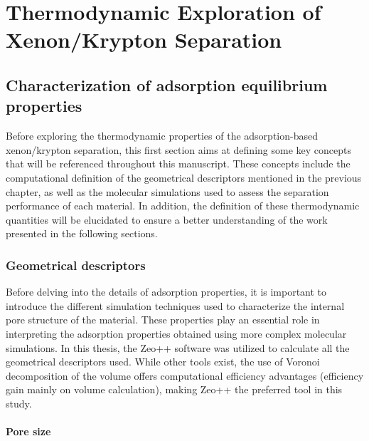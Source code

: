 \documentclass[main.tex]{subfiles}
\begin{document}
\chapter{Thermodynamic Exploration of Xenon/Krypton Separation}
\vspace*{-1\baselineskip}

\section{Characterization of adsorption equilibrium properties}

Before exploring the thermodynamic properties of the adsorption-based xenon/krypton separation, this first section aims at  defining some key concepts that will be referenced throughout this manuscript. These concepts include the computational definition of the geometrical descriptors mentioned in the previous chapter, as well as the molecular simulations used to assess the separation performance of each material. In addition, the definition of these thermodynamic quantities will be elucidated to ensure a better understanding of the work presented in the following sections.

\subsection{Geometrical descriptors}

Before delving into the details of adsorption properties, it is important to introduce the different simulation techniques used to characterize the internal pore structure of the material. These properties play an essential role in interpreting the adsorption properties obtained using more complex molecular simulations. In this thesis, the Zeo++ software was utilized to calculate all the geometrical descriptors used.\autocite{Zeo++} While other tools exist,\autocite{First_2013,PoreBlazer} the use of Voronoi decomposition of the volume offers computational efficiency advantages (efficiency gain mainly on volume calculation),\autocite{Rycroft_2009} making Zeo++ the preferred tool in this study.

\subsubsection{Pore size}
\end{document}
